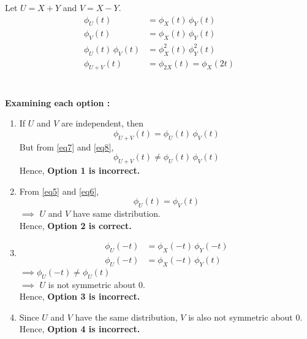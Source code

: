 \documentclass[journal,12pt,twocolumn]{IEEEtran}
\begin{document}
Let $U=X+Y$ and $V=X-Y$.
\begin{align}
    \phi_U(t) &= \phi_X(t)\, \phi_Y(t) \label{eq5}\\
    \phi_V(t) &= \phi_X(t)\, \phi_Y(t) \label{eq6}\\
    \phi_U(t) \, \phi_V(t) &= \phi_X^2(t) \, \phi_Y^2(t) \label{eq7}\\
    \phi_{U+V}(t) &= \phi_{2X}(t) = \phi_{X}(2t) \label{eq8}
\end{align}
\\\\
\textbf{Examining each option :} 
\begin{enumerate}
    \item 
    If $U$ and $V$ are independent, then \[\phi_{U+V}(t) = \phi_U(t)\, \phi_V(t)\]
    But from \eqref{eq7} and \eqref{eq8}, 
    \begin{equation}
        \phi_{U+V}(t) \neq \phi_U(t)\, \phi_V(t)
    \end{equation}
    Hence, \textbf{Option 1 is incorrect.}\\
    
    \item 
    From \eqref{eq5} and \eqref{eq6}, \[\phi_U(t) = \phi_V(t)\]
    $\implies$ $U$ and $V$ have same distribution.\\
    Hence, \textbf{Option 2 is correct.}\\
    
    \item 
    \begin{align}
        \phi_U(-t) &= \phi_X(-t)\, \phi_Y(-t) \\
        \phi_U(-t) &= \phi_X(-t)\, \phi_Y(t) 
    \end{align}
    \(\implies \phi_U(-t) \neq \phi_U(t)\) \\
    $\implies$ $U$ is not symmetric about $0$.\\
    Hence, \textbf{Option 3 is incorrect.}\\
    
    \item 
    Since $U$ and $V$ have the same distribution, $V$ is also not symmetric about $0$.\\
    Hence, \textbf{Option 4 is incorrect.}
\end{enumerate}
\end{document}

